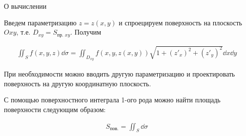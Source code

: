\begin{remark}
  О вычислении

  Введем параметризацию \(z = z(x, y)\) и спроецируем поверхность на плоскость
  \(Oxy\), т.е. \(D_{xy} = S_{\text{пр. }xy}\). Получим

  \begin{align*}
    \iint_{S} f(x, y, z) \dd \sigma
    = \iint_{D_{xy}} f(x, y, z(x, y))
      \sqrt{1 + (z'_{x})^2 + (z'_{y})^2} \dd x \dd y
  \end{align*}

  При необходимости можно вводить другую параметризацию и проектировать
  поверхность на другую координатную плоскость.
\end{remark}

\begin{remark}
  С помощью поверхностного интеграла 1-ого рода можно найти площадь поверхности
  следующим образом:

  \begin{align*}
    S_{\text{пов.}} = \iint_{S} \dd \sigma
  \end{align*}
\end{remark}